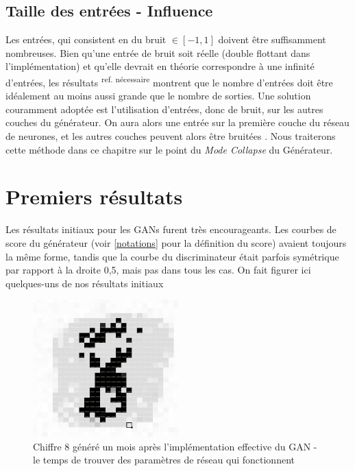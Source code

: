 \subsection{Taille des entrées - Influence}

Les entrées, qui consistent en du bruit $\in [-1,1]$ doivent être suffisamment nombreuses. Bien qu'une entrée de bruit soit réelle (double flottant dans l'implémentation) et qu'elle devrait en théorie correspondre à une infinité d'entrées, les résultats \textsuperscript{ref. nécessaire} montrent que le nombre d'entrées doit être idéalement au moins aussi grande que le nombre de sorties.
Une solution couramment adoptée est l'utilisation d'entrées, donc de bruit, sur les autres couches du générateur. On aura alors une entrée sur la première couche du réseau de neurones, et les autres couches peuvent alors être bruitées \cite{goodfellow_nips_2016}. Nous traiterons cette méthode dans ce chapitre sur le point du \textit{Mode Collapse} du Générateur.

\section{Premiers résultats}

Les résultats initiaux pour les GANs furent très encourageants. Les courbes de score du générateur (voir \ref{notations} pour la définition du score) avaient toujours la même forme, tandis que la courbe du discriminateur était parfois symétrique par rapport à la droite 0,5, mais pas dans tous les cas. On fait figurer ici quelques-uns de nos résultats initiaux
\begin{figure}[H]
\begin{center}
\includegraphics[width=0.5\textwidth]{images/18_01_12-GAN/image.png}\caption{Chiffre 8 généré un mois après l'implémentation effective du GAN - le temps de trouver des paramètres de réseau qui fonctionnent}
\end{center}
\end{figure}

